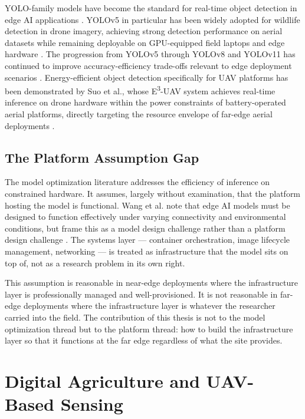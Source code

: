 YOLO-family models have become the standard for real-time object detection in edge AI applications \cite{redmon2016yolo}. YOLOv5 in particular has been widely adopted for wildlife detection in drone imagery, achieving strong detection performance on aerial datasets while remaining deployable on GPU-equipped field laptops and edge hardware \cite{waid2023dataset}. The progression from YOLOv5 through YOLOv8 and YOLOv11 has continued to improve accuracy-efficiency trade-offs relevant to edge deployment scenarios \cite{jocher2020yolov5, waid2023dataset}. Energy-efficient object detection specifically for UAV platforms has been demonstrated by Suo et al., whose E\textsuperscript{3}-UAV system achieves real-time inference on drone hardware within the power constraints of battery-operated aerial platforms, directly targeting the resource envelope of far-edge aerial deployments \cite{suo20233}.
\subsection{The Platform Assumption Gap}
\label{sec:platform_gap}
The model optimization literature addresses the efficiency of inference on constrained hardware. It assumes, largely without examination, that the platform hosting the model is functional. Wang et al. note that edge AI models must be designed to function effectively under varying connectivity and environmental conditions, but frame this as a model design challenge rather than a platform design challenge \cite{wang2023ondevice}. The systems layer — container orchestration, image lifecycle management, networking — is treated as infrastructure that the model sits on top of, not as a research problem in its own right.

This assumption is reasonable in near-edge deployments where the infrastructure layer is professionally managed and well-provisioned. It is not reasonable in far-edge deployments where the infrastructure layer is whatever the researcher carried into the field. The contribution of this thesis is not to the model optimization thread but to the platform thread: how to build the infrastructure layer so that it functions at the far edge regardless of what the site provides.


\section{Digital Agriculture and UAV-Based Sensing}
\label{sec:digi_agri}
